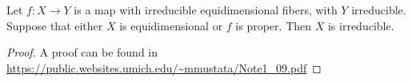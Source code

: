 \documentclass[11pt]{amsart}
\begin{document}
\begin{proposition}\label{prop:irred-criterion}
Let $f\colon X\to Y$ is a map with irreducible equidimensional fibers, with $Y$ irreducible. Suppose that either $X$ is equidimensional or $f$ is proper. Then $X$ is irreducible.
\end{proposition}
\begin{proof} A proof can be found in \url{https://public.websites.umich.edu/~mmustata/Note1_09.pdf}
\end{proof}




\printbibliography
\end{document}
